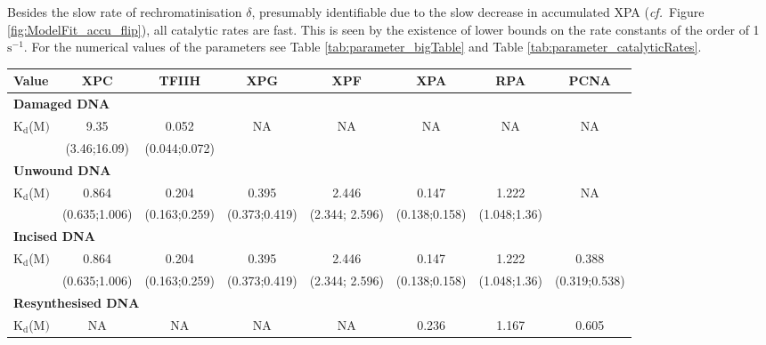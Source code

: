 Besides the slow rate of rechromatinisation $\delta$, presumably identifiable due to the slow decrease in accumulated XPA (\textit{cf.}\ Figure \ref{fig:ModelFit_accu_flip}), all catalytic rates are fast. This is seen by the existence of lower bounds on the rate constants of the order of 1 $\text{s}^{-1}$. For the numerical values of the parameters see Table \ref{tab:parameter_bigTable} and Table \ref{tab:parameter_catalyticRates}. 



\begin{landscape}
	\centering
\begin{table}[t]
	
	\small{
	\begin{tabular}[angle=90]{p{2cm}ccccccc}
	\hline
	\textbf{Value}    & \textbf{ XPC} & \textbf{TFIIH} & \textbf{XPG} & \textbf{XPF} & \textbf{XPA} & \textbf{RPA} & \textbf{PCNA}  \\
	\hline
	\multicolumn{8}{l}{\textbf{Damaged DNA}} \\
	$\text{K}_{\text{d}}$({\textmu}$\text{M})$                                                  & 9.35                & 0.052 & NA &NA&NA&NA&NA     \\
	& (3.46;16.09)     &(0.044;0.072)  &&&&&   \\
	\multicolumn{8}{l}{\textbf{Unwound DNA}} \\
	$\text{K}_{\text{d}}$({\textmu}$\text{M})$                                                  & 0.864                     & 0.204                   & 0.395                 &2.446                 &0.147                    &1.222                    &NA     \\
	& (0.635;1.006)     & (0.163;0.259)             & (0.373;0.419)		&(2.344; 2.596)&(0.138;0.158)     &  (1.048;1.36)  &   \\
	\multicolumn{8}{l}{\textbf{Incised DNA}} \\
	$\text{K}_{\text{d}}$({\textmu}$\text{M})$                                                  & 0.864                     & 0.204                   & 0.395                 &2.446                 &0.147                    &1.222                    &0.388     \\
	& (0.635;1.006)     & (0.163;0.259)             & (0.373;0.419)		&(2.344; 2.596)&(0.138;0.158)     &  (1.048;1.36) 	 & (0.319;0.538)  \\
	\multicolumn{8}{l}{\textbf{Resynthesised DNA}} \\
	$\text{K}_{\text{d}}$({\textmu}$\text{M})$                                                  & NA                          &NA                         & NA                      &NA                      &0.236                   &1.167                    &0.605     \\

\end{tabular}}
\end{table}
\end{landscape}
